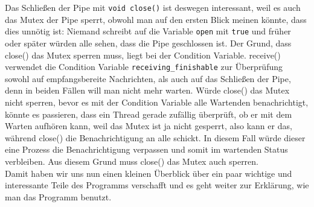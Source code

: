 Das Schließen der Pipe mit \verb|void close()| ist deswegen interessant, weil es auch das Mutex der Pipe sperrt, obwohl man auf den ersten Blick meinen 
könnte, dass dies unnötig ist: Niemand schreibt auf die Variable \verb|open| mit \verb|true| und früher oder später würden alle sehen, dass die Pipe 
geschlossen ist. Der Grund, dass close() das Mutex sperren muss, liegt bei der Condition Variable. receive() verwendet die Condition Variable 
\verb|receiving_finishable| zur Überprüfung sowohl auf empfangsbereite Nachrichten, als auch auf das Schließen der Pipe, denn in beiden Fällen will man nicht 
mehr warten. Würde close() das Mutex nicht sperren, bevor es mit der Condition Variable alle Wartenden benachrichtigt, könnte es passieren, dass ein Thread 
gerade zufällig überprüft, ob er mit dem Warten aufhören kann, weil das Mutex ist ja nicht gesperrt, also kann er das, während close() die Benachrichtigung an 
alle schickt. In diesem Fall würde dieser eine Prozess die Benachrichtigung verpassen und somit im wartenden Status verbleiben. 
Aus diesem Grund muss close() das Mutex auch sperren.
\\

Damit haben wir uns nun einen kleinen Überblick über ein paar wichtige und interessante Teile des Programms verschafft und es geht weiter zur 
Erklärung, wie man das Programm benutzt.
